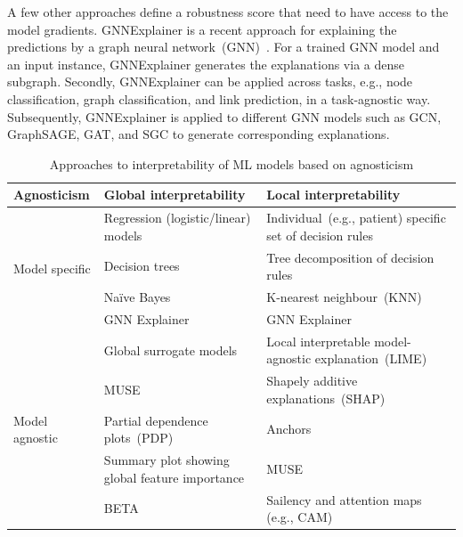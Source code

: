 \hspace*{3.5mm} A few other approaches define a robustness score that need to have access to the model gradients. GNNExplainer is a recent approach for explaining the predictions by a graph neural network~(GNN)~\cite{ying2019gnnexplainer}. For a trained GNN model and an input instance, GNNExplainer generates the explanations via a dense subgraph. Secondly, GNNExplainer can be applied across tasks, e.g., node classification, graph classification, and link prediction, in a task-agnostic way. Subsequently, GNNExplainer is applied to different GNN models such as GCN, GraphSAGE, GAT, and SGC to generate corresponding explanations. 

\begin{table}[h]
    \centering
    \scriptsize
    \caption{Approaches to interpretability of ML models based on agnosticism}
    \label{tab:global_vs_lical_xai}
    \vspace{-2mm}
    \begin{tabular}{l|l|l} 
        \hline
        \textbf{Agnosticism}  & \textbf{Global interpretability}  & \textbf{Local interpretability} \\ 
        \hline
        \multirow{4}{*}{Model specific} & Regression (logistic/linear) models & Individual~(e.g., patient) specific set of decision rules \\ 
        \cline{2-3}
        & Decision trees & Tree decomposition of decision rules \\ 
        \cline{2-3}
        & Naïve Bayes & K-nearest neighbour~(KNN)\\ 
        \cline{2-3}
        & GNN Explainer~\cite{GNNEXPLAINER} & GNN Explainer~\cite{GNNEXPLAINER} \\ 
        \hline
        \multirow{5}{*}{Model agnostic} & Global surrogate models  & Local interpretable model-agnostic explanation~(LIME)~\cite{LIME}\\ 
        \cline{2-3}
        &  MUSE  & Shapely additive explanations~(SHAP)~\cite{SHAP}\\ 
        \cline{2-3}
        & Partial dependence plots~(PDP) & Anchors~\cite{ribeiro2018anchors} \\ 
        \cline{2-3}
        & Summary plot showing global feature importance & MUSE \\ 
        \cline{2-3}
        & BETA~\cite{BETA} & Sailency and attention maps (e.g., CAM)\\ 
        \hline
    \end{tabular}
    \vspace{-4mm}
\end{table}

